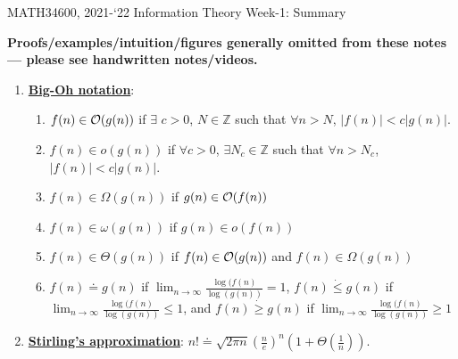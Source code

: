 \documentclass[10pt]{article}
\date{}
\begin{document}
\vspace{-0.95in}
\begin{center}
{\Large{MATH34600, 2021-`22 \hfill Information Theory \hfill Week-1: Summary}}\\
\end{center}

{\bf Proofs/examples/intuition/figures generally omitted from these notes --- please see handwritten notes/videos.}


\begin{enumerate}
\item {\bf \underline{Big-Oh notation}}:
\begin{enumerate}
	\item $f(n) \in {\cal O}(g(n))$ if $\exists$ $c > 0$, $N \in {\mathbb Z}$ such that $\forall n > N$, $|f(n)| < c|g(n)|$.
	\item $f(n) \in o(g(n))$ if  $\forall c > 0$, $\exists N_c \in {\mathbb Z}$ such that $\forall n > N_c$, $|f(n)| < c|g(n)|$.
	\item $f(n) \in \Omega(g(n))$ if $g(n) \in {\cal O}(f(n))$
	\item $f(n) \in \omega(g(n))$ if $g(n) \in o(f(n))$
	\item $f(n) \in \Theta(g(n))$ if $f(n) \in {\cal O}(g(n))$ and $f(n) \in \Omega(g(n))$
	\item $f(n) \doteq g(n)$ if $\lim_{n\rightarrow \infty} \frac{\log(f(n)}{\log(g(n))} = 1 $, $f(n) \dot{\leq} g(n)$ if $\lim_{n\rightarrow \infty} \frac{\log(f(n)}{\log(g(n))} \leq 1 $, and $f(n) \dot{\geq} g(n)$ if $\lim_{n\rightarrow \infty} \frac{\log(f(n)}{\log(g(n))} \geq 1 $
\end{enumerate}

\item {\bf \underline{Stirling's approximation}}: $n! \doteq \sqrt{2\pi n}\left (\frac{n}{e} \right )^n\left ( 1 + \Theta\left ( \frac{1}{n}\right) \right)$.



\end{enumerate}
\end{document}
